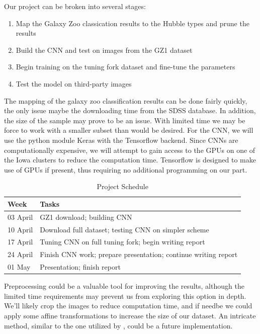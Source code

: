 \documentclass{article}
\begin{document}
Our project can be broken into several stages:
\begin{enumerate}
\item	Map the Galaxy Zoo classication results to the Hubble types and prune the results
\item	Build the CNN and test on images from the GZ1 dataset
\item	Begin training on the tuning fork dataset and fine-tune the parameters
\item	Test the model on third-party images
\end{enumerate}

The mapping of the galaxy zoo classification results can be done fairly quickly, the only issue maybe the downloading time from the SDSS database. In addition, the size of the sample may prove to be an issue. With limited time we may be force to work with a smaller subset than would be desired. For the CNN, we will use the python module Keras with the Tensorflow backend. Since CNNs are computationally expensive, we will attempt to gain access to the GPUs on one of the Iowa clusters to reduce the computation time. Tensorflow is designed to make use of GPUs if present, thus requiring no additional programming on our part.

\begin{table}[!h]
  \caption{Project Schedule}
  \label{tab:plan}
  \centering
  \begin{tabular}{ll}
    \toprule
    \cmidrule{1-2}
    Week     & Tasks \\
    \midrule
    03 April 	& GZ1 download; building CNN    \\
    10 April    & Download full dataset; testing CNN on simpler scheme \\
    17 April    & Tuning CNN on full tuning fork; begin writing report       \\
	24 April	& Finish CNN work; prepare presentation; continue writing report  \\
	01 May		& Presentation; finish report \\
    \bottomrule
  \end{tabular}
\end{table}

Preprocessing could be a valuable tool for improving the results, although the limited time requirements may prevent us from exploring this option in depth. We'll likely crop the images to reduce computation time, and if needbe we could apply some affine transformations to increase the size of our dataset. An intricate method, similar to the one utilized by \cite{2015MNRAS.450.1441D}, could be a future implementation.
\end{document}
